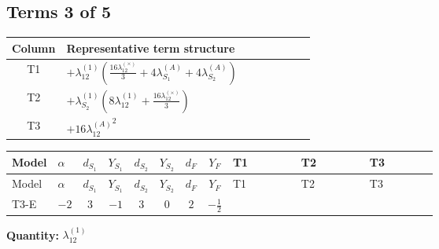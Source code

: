 \documentclass[8pt]{article}
\begin{document}
\begin{landscape}
\subsection*{Terms 3 of 5}
\begin{center}
\begin{tabular}{@{}c >{\raggedright\arraybackslash}p{0.82\linewidth}@{}}
\toprule
Column & Representative term structure \\
\midrule
T1 & \(\displaystyle +{\lambda_{12}^{(1)}} \left(\frac{16 {\lambda_{12}^{(\times)}}}{3}+4 {\lambda_{S_1}^{(A)}}+4 {\lambda_{S_2}^{(A)}}\right)\) \\
\midrule
T2 & \(\displaystyle +{\lambda_{S_2}^{(1)}} \left(8 {\lambda_{12}^{(1)}}+\frac{16 {\lambda_{12}^{(\times)}}}{3}\right)\) \\
\midrule
T3 & \(\displaystyle +16 {\lambda_{12}^{(A)}}^2\) \\
\midrule
\bottomrule
\end{tabular}
\end{center}
\smallskip
\tiny
\begin{longtable}{@{}llcccccc >{\raggedright\arraybackslash}p{0.21\linewidth} >{\raggedright\arraybackslash}p{0.21\linewidth} >{\raggedright\arraybackslash}p{0.21\linewidth}@{}}
\toprule
Model & $\alpha$ & $d_{S_1}$ & $Y_{S_1}$ & $d_{S_2}$ & $Y_{S_2}$ & $d_F$ & $Y_F$ & T1 & T2 & T3 \\
\midrule
\endfirsthead
\toprule
Model & $\alpha$ & $d_{S_1}$ & $Y_{S_1}$ & $d_{S_2}$ & $Y_{S_2}$ & $d_F$ & $Y_F$ & T1 & T2 & T3 \\
\midrule
\endhead
T3-E & $-2$ & $3$ & $-1$ & $3$ & $0$ & $2$ & $-\frac{1}{2}$ & \scriptsize\adjustbox{max width=\linewidth}{$\begin{gathered} +{\lambda_{12}^{(1)}} \left(\frac{16 {\lambda_{12}^{(\times)}}}{3}+4 {\lambda_{S_1}^{(A)}}+4 {\lambda_{S_2}^{(A)}}\right)\end{gathered}$} & \scriptsize\adjustbox{max width=\linewidth}{$\begin{gathered} +{\lambda_{S_2}^{(1)}} \left(8 {\lambda_{12}^{(1)}}+\frac{16 {\lambda_{12}^{(\times)}}}{3}\right)\end{gathered}$} & \scriptsize\adjustbox{max width=\linewidth}{$\begin{gathered} +16 {\lambda_{12}^{(A)}}^2\end{gathered}$} \\
\midrule
\bottomrule
\end{longtable}
\clearpage
\noindent\textbf{Quantity: }$\lambda_{12}^{(1)}$\par\smallskip

\end{landscape}
\end{document}
